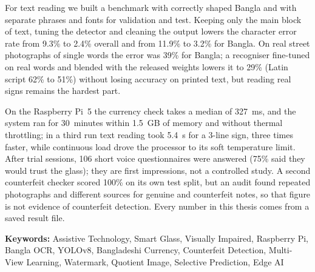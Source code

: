 For text reading we built a benchmark with correctly shaped Bangla and with separate phrases and fonts for validation and test. Keeping only the main block of text, tuning the detector and cleaning the output lowers the character error rate from 9.3\% to 2.4\% overall and from 11.9\% to 3.2\% for Bangla. On real street photographs of single words the error was 39\% for Bangla; a recogniser fine-tuned on real words and blended with the released weights lowers it to 29\% (Latin script 62\% to 51\%) without losing accuracy on printed text, but reading real signs remains the hardest part.

On the Raspberry Pi~5 the currency check takes a median of 327~ms, and the system ran for 30~minutes within 1.5~GB of memory and without thermal throttling; in a third run text reading took 5.4~s for a 3-line sign, three times faster, while continuous load drove the processor to its soft temperature limit. After trial sessions, 106 short voice questionnaires were answered (75\% said they would trust the glass); they are first impressions, not a controlled study. A second counterfeit checker scored 100\% on its own test split, but an audit found repeated photographs and different sources for genuine and counterfeit notes, so that figure is not evidence of counterfeit detection. Every number in this thesis comes from a saved result file.

\vspace{0.5cm}
\noindent\textbf{Keywords:} Assistive Technology, Smart Glass, Visually Impaired, Raspberry Pi, Bangla OCR, YOLOv8, Bangladeshi Currency, Counterfeit Detection, Multi-View Learning, Watermark, Quotient Image, Selective Prediction, Edge AI
\clearpage
